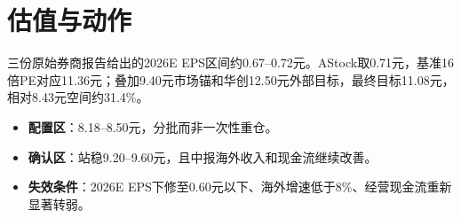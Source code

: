 \section{估值与动作}

三份原始券商报告给出的2026E EPS区间约0.67--0.72元。AStock取0.71元，基准16倍PE对应11.36元；叠加9.40元市场锚和华创12.50元外部目标，最终目标11.08元，相对8.43元空间约31.4\%。

\begin{itemize}
  \item \textbf{配置区}：8.18--8.50元，分批而非一次性重仓。
  \item \textbf{确认区}：站稳9.20--9.60元，且中报海外收入和现金流继续改善。
  \item \textbf{失效条件}：2026E EPS下修至0.60元以下、海外增速低于8\%、经营现金流重新显著转弱。
\end{itemize}
